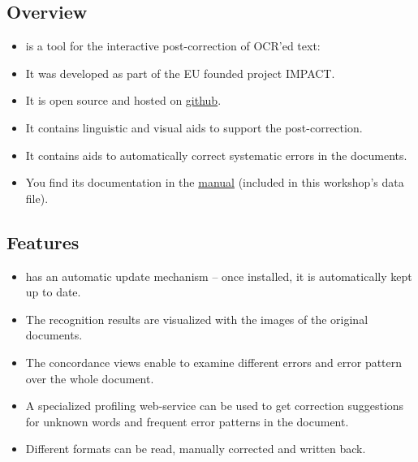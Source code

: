 \subsection{Overview}
\begin{frame}
	\begin{itemize}
		\item \pocoto{} is a tool for the interactive post-correction of OCR'ed
			text:
		\item It was developed as part of the EU founded project IMPACT.
		\item It is open source and hosted on
			\href{https://github.com/cisocrgroup/PoCoTo}{github}.
		\item It contains linguistic and visual aids to support the post-correction.
		\item It contains aids to automatically correct systematic errors in the
			documents.
		\item You find its documentation in the
			\href{https://github.com/cisocrgroup/Resources/blob/master/manuals/pocoto-manual.md}{\pocoto{}
			manual} (included in this workshop's data file).
	\end{itemize}
\end{frame}

\subsection{Features}
\begin{frame}
	\begin{itemize}
		\item \pocoto{} has an automatic update mechanism -- once installed, it is
			automatically kept up to date.
		\item The recognition results are visualized with the images of the original
			documents.
		\item The concordance views enable to examine different errors and error
			pattern over the whole document.
		\item A specialized profiling web-service can be used to get correction
			suggestions for unknown words and frequent error patterns in the document.
		\item Different formats can be read, manually corrected and written back.
	\end{itemize}
\end{frame}

